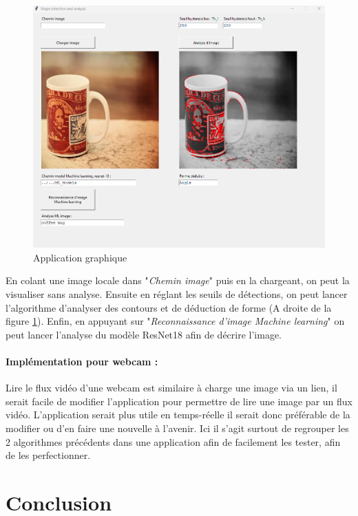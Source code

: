\begin{figure}[h]
	\centering
	\includegraphics[width=0.8\linewidth]{Figures/Exemple_appli}
	\caption{Application graphique}
	\label{fig:exempleappli}
\end{figure}

En colant une image locale dans "\textit{Chemin image}" puis en la chargeant, on peut la visualiser sans analyse. Ensuite en réglant les seuils de détections, on peut lancer l'algorithme d'analyser des contours et de déduction de forme (A droite de la figure \ref{fig:exempleappli}). Enfin, en appuyant sur "\textit{Reconnaissance d'image Machine learning}" on peut lancer l'analyse du modèle ResNet18 afin de décrire l'image. 

\paragraph{Implémentation pour webcam :} Lire le flux vidéo d'une webcam est similaire à charge une image via un lien, il serait facile de modifier l'application pour permettre de lire une image par un flux vidéo. L'application serait plus utile en temps-réelle il serait donc préférable de la modifier ou d'en faire une nouvelle à l'avenir. Ici il s'agit surtout de regrouper les 2 algorithmes précédents dans une application afin de facilement les tester, afin de les perfectionner.

\clearpage
\section{Conclusion}

